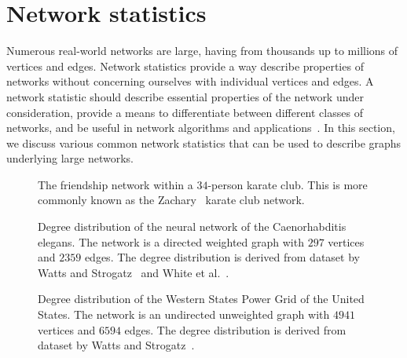 \section{Network statistics}

Numerous real-world networks are large, having from thousands up to
millions of vertices and edges. Network statistics provide a way
describe properties of networks without concerning ourselves with
individual vertices and edges. A network statistic should describe
essential properties of the network under consideration, provide a
means to differentiate between different classes of networks, and be
useful in network algorithms and
applications~\cite{BrinkmeierSchank2005}. In this section, we discuss
various common network statistics that can be used to describe graphs
underlying large networks.

\begin{figure}[!htbp]
\centering
{}

\caption{The friendship network within a $34$-person karate club. This
  is more commonly known as the Zachary~\cite{Zachary1977} karate club
  network.}
\label{fig:random_graphs:Zachary_karate_club}
\end{figure}

\begin{figure}[!htbp]
\centering
{}

\caption{Degree distribution of the neural network of the
  Caenorhabditis elegans. The network is a directed weighted graph
  with $297$ vertices and $2359$ edges. The degree distribution is
  derived from dataset by Watts and Strogatz~\cite{WattsStrogatz1998}
  and White et al.~\cite{WhiteEtAl1986}.}
\label{fig:random_graphs:degree_distribution:neural_network_C_elegans}
\end{figure}

\begin{figure}[!htbp]
\centering
{}

\caption{Degree distribution of the Western States Power Grid of the
  United States. The network is an undirected unweighted graph with
  $4941$ vertices and $6594$ edges. The degree distribution is derived
  from dataset by Watts and Strogatz~\cite{WattsStrogatz1998}.}
\label{fig:random_graphs:degree_distribution:power_grid}
\end{figure}

